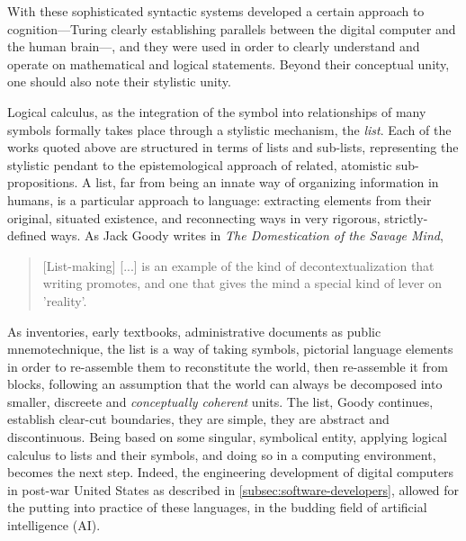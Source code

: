 With these sophisticated syntactic systems developed a certain approach to cognition—Turing clearly establishing parallels between the digital computer and the human brain—, and they were used in order to clearly understand and operate on mathematical and logical statements. Beyond their conceptual unity, one should also note their stylistic unity.

Logical calculus, as the integration of the symbol into relationships of many symbols formally takes place through a stylistic mechanism, the \emph{list}. Each of the works quoted above are structured in terms of lists and sub-lists, representing the stylistic pendant to the epistemological approach of related, atomistic sub-propositions. A list, far from being an innate way of organizing information in humans, is a particular approach to language: extracting elements from their original, situated existence, and reconnecting ways in very rigorous, strictly-defined ways. As Jack Goody writes in \emph{The Domestication of the Savage Mind},

\begin{quote}
    [List-making] [...] is an example of the kind of decontextualization that writing promotes, and one that gives the mind a special kind of lever on 'reality'.\cite{goody_domestication_1977}
\end{quote}

As inventories, early textbooks, administrative documents as public mnemotechnique, the list is a way of taking symbols, pictorial language elements in order to re-assemble them to reconstitute the world, then re-assemble it from blocks, following an assumption that the world can always be decomposed into smaller, discreete and \emph{conceptually coherent} units. The list, Goody continues, establish clear-cut boundaries, they are simple, they are abstract and discontinuous. Being based on some singular, symbolical entity, applying logical calculus to lists and their symbols, and doing so in a computing environment, becomes the next step. Indeed, the engineering development of digital computers in post-war United States as described in \ref{subsec:software-developers}, allowed for the putting into practice of these languages, in the budding field of artificial intelligence (AI).

